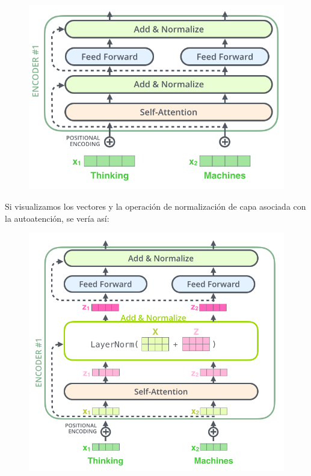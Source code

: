 \begin{figure}[h]
  \centering
  \includegraphics[scale=0.3]{pics/transformer_resideual_layer_norm.png}
\end{figure}

Si visualizamos los vectores y la operación de normalización de capa asociada con la autoatención, se vería así:

\begin{figure}[h]
  \centering
  \includegraphics[scale=0.3]{pics/transformer_resideual_layer_norm_2.png}
\end{figure}


